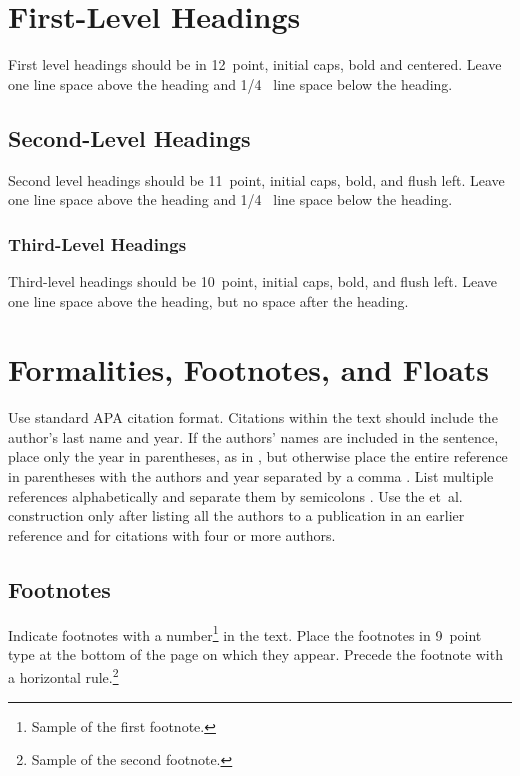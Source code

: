 \documentclass[10pt,letterpaper]{article}
\begin{document}
\section{First-Level Headings}

First level headings should be in 12~point, initial caps, bold and
centered. Leave one line space above the heading and 1/4~ line space
below the heading.


\subsection{Second-Level Headings}

Second level headings should be 11~point, initial caps, bold, and
flush left. Leave one line space above the heading and 1/4~ line
space below the heading.


\subsubsection{Third-Level Headings}

Third-level headings should be 10~point, initial caps, bold, and flush
left. Leave one line space above the heading, but no space after the
heading.


\section{Formalities, Footnotes, and Floats}

Use standard APA citation format. Citations within the text should
include the author's last name and year. If the authors' names are
included in the sentence, place only the year in parentheses, as in
, but otherwise place the entire reference in
parentheses with the authors and year separated by a comma
\cite{NewellSimon1972a}. List multiple references alphabetically and
separate them by semicolons
\cite{ChalnickBillman1988a,NewellSimon1972a}. Use the
et~al. construction only after listing all the authors to a
publication in an earlier reference and for citations with four or
more authors.


\subsection{Footnotes}

Indicate footnotes with a number\footnote{Sample of the first
  footnote.} in the text. Place the footnotes in 9~point type at the
bottom of the page on which they appear. Precede the footnote with a
horizontal rule.\footnote{Sample of the second footnote.}
\end{document}
